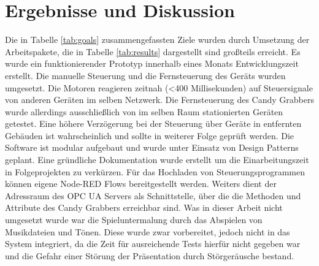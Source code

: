 \documentclass[BMR,Bachelor,ngerman]{twbook}%
\begin{document}
\chapter{Ergebnisse und Diskussion}
Die in Tabelle \ref{tab:goals} zusammengefassten Ziele wurden durch Umsetzung der Arbeitspakete, die in Tabelle \ref{tab:results} dargestellt sind großteils erreicht. Es wurde ein funktionierender Prototyp innerhalb eines Monats Entwicklungszeit erstellt. Die manuelle Steuerung und die Fernsteuerung des Geräts wurden umgesetzt. Die Motoren reagieren zeitnah (<400 Millisekunden) auf Steuersignale von anderen Geräten im selben Netzwerk. Die Fernsteuerung des Candy Grabbers wurde allerdings ausschließlich von im selben Raum stationierten Geräten getestet. Eine höhere Verzögerung bei der Steuerung über Geräte in entfernten Gebäuden ist wahrscheinlich und sollte in weiterer Folge geprüft werden. Die Software ist modular aufgebaut und wurde unter Einsatz von Design Patterns geplant. Eine gründliche Dokumentation wurde erstellt um die Einarbeitungszeit in Folgeprojekten zu verkürzen. Für das Hochladen von Steuerungsprogrammen können eigene Node-RED Flows bereitgestellt werden. Weiters dient der Adressraum des \ac{OPC UA} Servers als Schnittstelle, über die die Methoden und Attribute des Candy Grabbers erreichbar sind. Was in dieser Arbeit nicht umgesetzt wurde war die Spieluntermalung durch das Abspielen von Musikdateien und Tönen. Diese wurde zwar vorbereitet, jedoch nicht in das System integriert, da die Zeit für ausreichende Tests hierfür nicht gegeben war und die Gefahr einer Störung der Präsentation durch Störgeräusche bestand.
\end{document}
